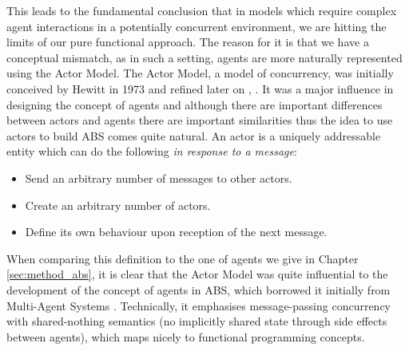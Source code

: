 This leads to the fundamental conclusion that in models which require complex agent interactions in a potentially concurrent environment, we are hitting the limits of our pure functional approach. The reason for it is that we have a conceptual mismatch, as in such a setting, agents are more naturally represented using the Actor Model. The Actor Model, a model of concurrency, was initially conceived by Hewitt in 1973 \cite{hewitt_universal_1973} and refined later on \cite{hewitt_what_2007}, \cite{hewitt_actor_2010}. It was a major influence in designing the concept of agents and although there are important differences between actors and agents there are important similarities thus the idea to use actors to build ABS comes quite natural. %
An actor is a uniquely addressable entity which can do the following \textit{in response to a message}:
\begin{itemize}
	\item Send an arbitrary number of messages to other actors.
	\item Create an arbitrary number of actors.
	\item Define its own behaviour upon reception of the next message.
\end{itemize}

When comparing this definition to the one of agents we give in Chapter \ref{sec:method_abs}, it is clear that the Actor Model was quite influential to the development of the concept of agents in ABS, which borrowed it initially from Multi-Agent Systems \cite{wooldridge_introduction_2009}. Technically, it emphasises message-passing concurrency with shared-nothing semantics (no implicitly shared state through side effects between agents), which maps nicely to functional programming concepts.

